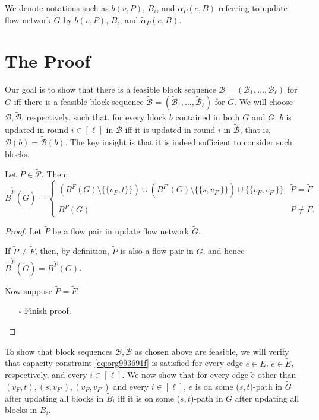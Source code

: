 \documentclass[fontsize=11pt,paper=a4]{book}
\begin{document}
We denote notations such as \(b(v,P)\), \(B_i\), and \(\alpha_P(e,B)\) referring to update flow network \(\tilde{G}\) by \(\tilde{b}(v,P)\), \(\tilde{B}_i\), and \(\tilde{\alpha}_P(e,B)\).

\section{The Proof}
\label{sec:org1c03502}

Our goal is to show that there is a feasible block sequence \(\mathcal{B}=(\mathscr{B}_1,\dots,\mathscr{B}_{\ell})\) for \(G\) iff there is a feasible block sequence \(\tilde{\mathcal{B}}=(\tilde{\mathscr{B}}_1,\dots,\tilde{\mathscr{B}}_{\ell})\) for \(\tilde{G}\).
We will choose \(\mathcal{B},\tilde{\mathcal{B}}\), respectively, such that, for every block \(b\) contained in both \(G\) and \(\tilde{G}\), \(b\) is updated in round \(i\in[\ell]\) in \(\mathcal{B}\) iff it is updated in round \(i\) in \(\tilde{\mathcal{B}}\), that is, \(\mathcal{B}(b)=\tilde{\mathcal{B}}(b)\).
The key insight is that it is indeed sufficient to consider such blocks.

\begin{lem}
Let \(\tilde{P}\in\tilde{\mathcal{P}}\).
Then:
\[\tilde{B}^{\tilde{P}}(\tilde{G})=
\begin{cases}
\left(B^F(G)\setminus\{\{v_F,t\}\}\right)\cup\left(B^{F'}(G)\setminus\{\{s,v_{F'}\}\}\right)\cup\{\{v_F,v_{F'}\}\} & \tilde{P}=\tilde{F}\\
B^{\tilde{P}}(G) & \tilde{P}\neq\tilde{F}.
\end{cases}\]
\label{org67347d4}
\end{lem}

\begin{proof}
Let \(\tilde{P}\) be a flow pair in update flow network \(\tilde{G}\).

If \(\tilde{P}\neq\tilde{F}\), then, by definition, \(\tilde{P}\) is also a flow pair in \(G\), and hence \(\tilde{B}^{\tilde{P}}(\tilde{G})=B^{\tilde{P}}(G)\).

Now suppose \(\tilde{P}=\tilde{F}\).

\begin{itemize}
\item[{$\square$}] Finish proof.
\end{itemize}
\end{proof}

To show that block sequences \(\mathcal{B},\tilde{\mathcal{B}}\) as chosen above are feasible, we will verify that capacity constraint \ref{eq:org993691f} is satisfied for every edge \(e\in E\), \(\tilde{e}\in\tilde{E}\), respectively, and every \(i\in[\ell]\).
We now show that for every edge \(\tilde{e}\) other than \((v_F,t),(s,v_{F'}),(v_F,v_{F'})\) and every \(i\in[\ell]\), \(\tilde{e}\) is on some (\(s,t\))-path in \(\tilde{G}\) after updating all blocks in \(\tilde{B}_i\) iff it is on some (\(s,t\))-path in \(G\) after updating all blocks in \(B_i\).
\end{document}
